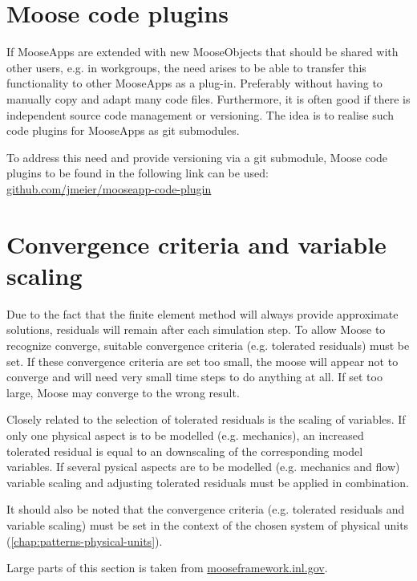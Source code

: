 \section{Moose code plugins}
\label{chap:patterns-code-plugins}

If MooseApps are extended with new MooseObjects that should be shared with
other users, e.g. in workgroups, the need arises to be able to transfer this
functionality to other MooseApps as a plug-in. Preferably without having to
manually copy and adapt many code files. Furthermore, it is often good if there
is independent source code management or versioning. The idea is to realise
such code plugins for MooseApps as git submodules.

To address this need and provide versioning via a git submodule, Moose code
plugins to be found in the following link can be used:
\href{https://github.com/jmeier/mooseapp-code-plugin}{github.com/jmeier/mooseapp-code-plugin}

\section{Convergence criteria and variable scaling}
\label{chap:patterns-converge-criteria-and-scaling}

Due to the fact that the finite element method will always provide approximate
solutions, residuals will remain after each simulation step. To allow Moose to
recognize converge, suitable convergence criteria (e.g. tolerated residuals)
must be set. If these convergence criteria are set too small, the moose will
appear not to converge and will need very small time steps to do anything at
all. If set too large, Moose may converge to the wrong result.

Closely related to the selection of tolerated residuals is the scaling of
variables. If only one physical aspect is to be modelled (e.g. mechanics), an
increased tolerated residual is equal to an downscaling of the corresponding
model variables. If several pysical aspects are to be modelled (e.g. mechanics
and flow) variable scaling and adjusting tolerated residuals must be applied in
combination.

It should also be noted that the convergence criteria (e.g. tolerated residuals
and variable scaling) must be set in the context of the chosen system of
physical units (\autoref{chap:patterns-physical-units}).

Large parts of this section is taken from
\href{https://mooseframework.inl.gov/modules/porous_flow/convergence.html}{mooseframework.inl.gov}.

